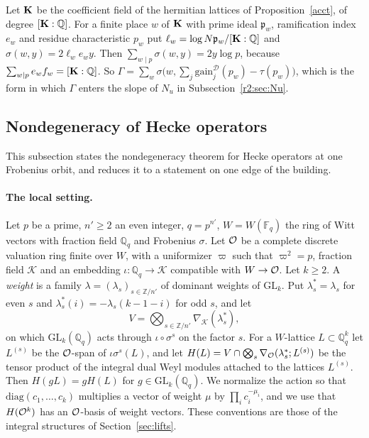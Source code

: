 \begin{remark}\label{r2:placeform}
Let $\mathbf K$ be the coefficient field of the hermitian lattices of Proposition~\ref{acct}, of degree $[\mathbf K:\mathbb Q]$. For a finite place $w$ of $\mathbf K$ with prime ideal $\mathfrak p_w$, ramification index $e_w$ and residue characteristic $p_w$ put $\ell_w=\log N\mathfrak p_w/[\mathbf K:\mathbb Q]$ and $\sigma(w,y)=2\ell_we_wy$. Then $\sum_{w\mid p}\sigma(w,y)=2y\log p$, because $\sum_{w\mid p}e_wf_w=[\mathbf K:\mathbb Q]$. So $\Gamma=\sum_w\sigma\big(w,\sum_j\mathrm{gain}^{\mathcal D}_j(p_w)-\tau(p_w)\big)$, which is the form in which $\Gamma$ enters the slope of $N_u$ in Subsection~\ref{r2:sec:Nu}.
\end{remark}
\subsection{Nondegeneracy of Hecke operators}\label{r2:sec:lp}

This subsection states the nondegeneracy theorem for Hecke operators at one Frobenius orbit, and reduces it to a statement on one edge of the building.

\paragraph{The local setting.} Let $p$ be a prime, $n'\ge2$ an even integer, $q=p^{n'}$, $W=W(\mathbb F_q)$ the ring of Witt vectors with fraction field $\mathbb Q_q$ and Frobenius $\sigma$. Let $\mathcal O$ be a complete discrete valuation ring finite over $W$, with a uniformizer $\varpi$ such that $\varpi^2=p$, fraction field $\mathcal K$ and an embedding $\iota\colon\mathbb Q_q\to\mathcal K$ compatible with $W\to\mathcal O$. Let $k\ge2$. A \emph{weight} is a family $\lambda=(\lambda_s)_{s\in\mathbb Z/n'}$ of dominant weights of $\mathrm{GL}_k$. Put $\lambda^*_s=\lambda_s$ for even $s$ and $\lambda^*_s(i)=-\lambda_s(k-1-i)$ for odd $s$, and let
\[
V=\bigotimes_{s\in\mathbb Z/n'}\nabla_{\mathcal K}(\lambda^*_s),
\]
on which $\mathrm{GL}_k(\mathbb Q_q)$ acts through $\iota\circ\sigma^s$ on the factor $s$. For a $W$-lattice $L\subset\mathbb Q_q^k$ let $L^{(s)}$ be the $\mathcal O$-span of $\iota\sigma^s(L)$, and let $H(L)=V\cap\bigotimes_s\nabla_\mathcal O(\lambda^*_s;L^{(s)})$ be the tensor product of the integral dual Weyl modules attached to the lattices $L^{(s)}$. Then $H(gL)=gH(L)$ for $g\in\mathrm{GL}_k(\mathbb Q_q)$. We normalize the action so that $\mathrm{diag}(c_1,\dots,c_k)$ multiplies a vector of weight $\mu$ by $\prod_ic_i^{-\mu_i}$, and we use that $H(\mathcal O^k)$ has an $\mathcal O$-basis of weight vectors. These conventions are those of the integral structures of Section~\ref{sec:lifts}.

